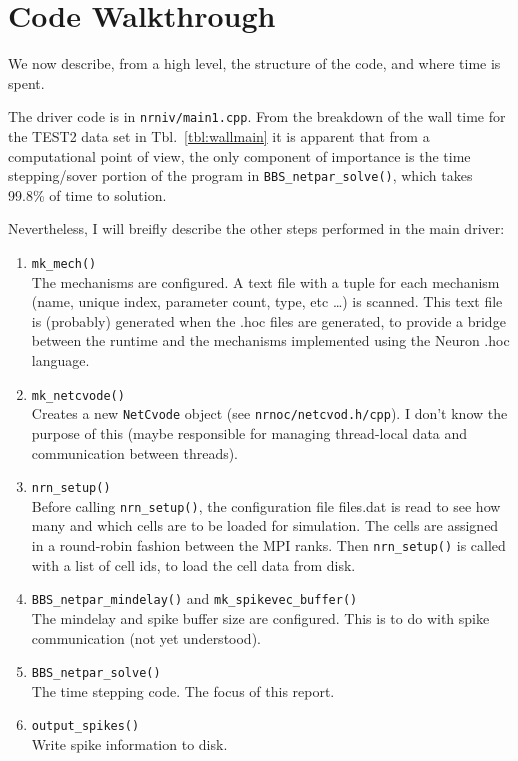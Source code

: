\documentclass[11pt,a4paper]{article}
\newcommand{\lst}[1]{\lstinline!#1!} %
\newcommand{\tbl}[1]{Tbl.~\ref{#1}} %
\newcommand{\file}[1]{\lstinline[basicstyle=\normalsize,]!#1!} %
\begin{document}
\section{Code Walkthrough}
We now describe, from a high level, the structure of the code, and where time is spent.

The driver code is in \file{nrniv/main1.cpp}. From the breakdown of the wall time for the TEST2 data set in \tbl{tbl:wallmain} it is apparent that from a computational point of view, the only component of importance is the time stepping/sover portion of the program in \lst{BBS_netpar_solve()}, which takes 99.8\% of time to solution.

Nevertheless, I will breifly describe the other steps performed in the main driver:
\begin{enumerate}
\item \lst{mk_mech()}\\
   The mechanisms are configured. A text file with a tuple for each mechanism (name, unique index, parameter count, type,  etc \dots) is scanned. This text file is (probably) generated when the .hoc files are generated, to provide a bridge between the runtime and the mechanisms implemented using the Neuron .hoc language.
\item \lst{mk_netcvode()}\\
    Creates a new \lst{NetCvode} object (see \file{nrnoc/netcvod.h/cpp}). I don't know the purpose of this (maybe responsible for managing thread-local data and communication between threads).
\item \lst{nrn_setup()}\\
    Before calling \lst{nrn_setup()}, the configuration file files.dat is read to see how many and which cells are to be loaded for simulation. The cells are assigned in a round-robin fashion between the MPI ranks. Then \lst{nrn_setup()} is called with a list of cell ids, to load the cell data from disk.
\item \lst{BBS_netpar_mindelay()} and \lst{mk_spikevec_buffer()}\\
    The mindelay and spike buffer size are configured. This is to do with spike communication (not yet understood).
\item \lst{BBS_netpar_solve()} \\
    The time stepping code. The focus of this report.
\item \lst{output_spikes()} \\
    Write spike information to disk.
\end{enumerate}
\end{document}
